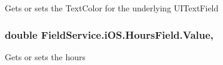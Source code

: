 Gets or sets the Text\+Color for the underlying U\+I\+Text\+Field 

\hypertarget{class_field_service_1_1i_o_s_1_1_hours_field_abae39462b0927207acb20d319bace78c}{
\subsubsection[{Value}]{\setlength{\rightskip}{0pt plus 5cm}double Field\+Service.\+i\+O\+S.\+Hours\+Field.\+Value\hspace{0.3cm}{\ttfamily [get]}, {\ttfamily [set]}}}\label{class_field_service_1_1i_o_s_1_1_hours_field_abae39462b0927207acb20d319bace78c}


Gets or sets the hours 



